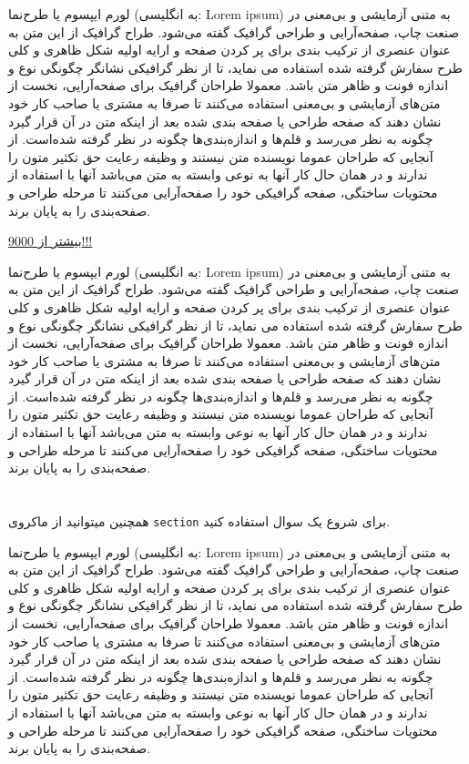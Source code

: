 \documentclass[11pt,largemargins]{homework}
\begin{document}
  لورم ایپسوم یا طرح‌نما (به انگلیسی: Lorem ipsum) به متنی آزمایشی و بی‌معنی در صنعت چاپ، صفحه‌آرایی و طراحی گرافیک گفته می‌شود. طراح گرافیک از این متن به عنوان عنصری از ترکیب بندی برای پر کردن صفحه و ارایه اولیه شکل ظاهری و کلی طرح سفارش گرفته شده استفاده می نماید، تا از نظر گرافیکی نشانگر چگونگی نوع و اندازه فونت و ظاهر متن باشد. معمولا طراحان گرافیک برای صفحه‌آرایی، نخست از متن‌های آزمایشی و بی‌معنی استفاده می‌کنند تا صرفا به مشتری یا صاحب کار خود نشان دهند که صفحه طراحی یا صفحه بندی شده بعد از اینکه متن در آن قرار گیرد چگونه به نظر می‌رسد و قلم‌ها و اندازه‌بندی‌ها چگونه در نظر گرفته شده‌است. از آنجایی که طراحان عموما نویسنده متن نیستند و وظیفه رعایت حق تکثیر متون را ندارند و در همان حال کار آنها به نوعی وابسته به متن می‌باشد آنها با استفاده از محتویات ساختگی، صفحه گرافیکی خود را صفحه‌آرایی می‌کنند تا مرحله طراحی و صفحه‌بندی را به پایان برند.

\setcounter{questionCounter}{9000}
\question
  \href{https://www.youtube.com/watch?v=SiMHTK15Pik}{بیشتر از 9000!!!}

  لورم ایپسوم یا طرح‌نما (به انگلیسی: Lorem ipsum) به متنی آزمایشی و بی‌معنی در صنعت چاپ، صفحه‌آرایی و طراحی گرافیک گفته می‌شود. طراح گرافیک از این متن به عنوان عنصری از ترکیب بندی برای پر کردن صفحه و ارایه اولیه شکل ظاهری و کلی طرح سفارش گرفته شده استفاده می نماید، تا از نظر گرافیکی نشانگر چگونگی نوع و اندازه فونت و ظاهر متن باشد. معمولا طراحان گرافیک برای صفحه‌آرایی، نخست از متن‌های آزمایشی و بی‌معنی استفاده می‌کنند تا صرفا به مشتری یا صاحب کار خود نشان دهند که صفحه طراحی یا صفحه بندی شده بعد از اینکه متن در آن قرار گیرد چگونه به نظر می‌رسد و قلم‌ها و اندازه‌بندی‌ها چگونه در نظر گرفته شده‌است. از آنجایی که طراحان عموما نویسنده متن نیستند و وظیفه رعایت حق تکثیر متون را ندارند و در همان حال کار آنها به نوعی وابسته به متن می‌باشد آنها با استفاده از محتویات ساختگی، صفحه گرافیکی خود را صفحه‌آرایی می‌کنند تا مرحله طراحی و صفحه‌بندی را به پایان برند.


\section{}
همچنین میتوانید از ماکروی 
\texttt{section}
برای شروع یک سوال استفاده کنید.

  لورم ایپسوم یا طرح‌نما (به انگلیسی: Lorem ipsum) به متنی آزمایشی و بی‌معنی در صنعت چاپ، صفحه‌آرایی و طراحی گرافیک گفته می‌شود. طراح گرافیک از این متن به عنوان عنصری از ترکیب بندی برای پر کردن صفحه و ارایه اولیه شکل ظاهری و کلی طرح سفارش گرفته شده استفاده می نماید، تا از نظر گرافیکی نشانگر چگونگی نوع و اندازه فونت و ظاهر متن باشد. معمولا طراحان گرافیک برای صفحه‌آرایی، نخست از متن‌های آزمایشی و بی‌معنی استفاده می‌کنند تا صرفا به مشتری یا صاحب کار خود نشان دهند که صفحه طراحی یا صفحه بندی شده بعد از اینکه متن در آن قرار گیرد چگونه به نظر می‌رسد و قلم‌ها و اندازه‌بندی‌ها چگونه در نظر گرفته شده‌است. از آنجایی که طراحان عموما نویسنده متن نیستند و وظیفه رعایت حق تکثیر متون را ندارند و در همان حال کار آنها به نوعی وابسته به متن می‌باشد آنها با استفاده از محتویات ساختگی، صفحه گرافیکی خود را صفحه‌آرایی می‌کنند تا مرحله طراحی و صفحه‌بندی را به پایان برند.
\end{document}
